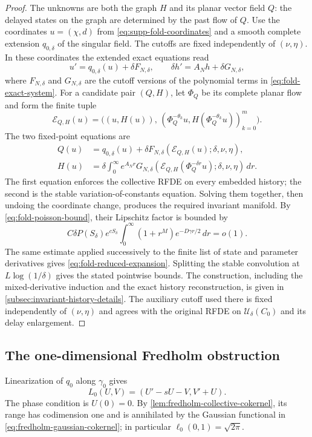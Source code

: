 \begin{proof}
The unknowns are both the graph \(H\) and its planar vector field \(Q\):
the delayed states on the graph are determined by the past flow of \(Q\).
Use the coordinates \(u=(\chi,d)\) from
\cref{eq:supp-fold-coordinates} and a smooth complete extension
\(q_{0,\delta}\) of the singular field.  The cutoffs are fixed independently
of \((\nu,\eta)\).  In these coordinates the extended exact equations read
\[
 u'=q_{0,\delta}(u)+\delta F_{N,\delta},\qquad
 \delta h'=A_Nh+\delta G_{N,\delta},
\]
where \(F_{N,\delta}\) and \(G_{N,\delta}\) are the cutoff versions of the
polynomial terms in \cref{eq:fold-exact-system}.  For a candidate pair
\((Q,H)\), let \(\Phi_Q\) be its complete planar flow and form the finite
tuple
\[
 \mathcal E_{Q,H}(u)=
 \bigl((u,H(u)),\,
       (\Phi_Q^{-\theta_k}u,H(\Phi_Q^{-\theta_k}u))_{k=0}^m\bigr).
\]
The two fixed-point equations are
\begin{align*}
 Q(u)&=q_{0,\delta}(u)+\delta F_{N,\delta}
                (\mathcal E_{Q,H}(u);\delta,\nu,\eta),\\
 H(u)&=\delta\int_0^\infty e^{A_Nr}G_{N,\delta}
       (\mathcal E_{Q,H}(\Phi_Q^{-\delta r}u);\delta,\nu,\eta)\,dr.
\end{align*}
The first equation enforces the collective RFDE on every embedded history;
the second is the stable variation-of-constants equation.  Solving them
together, then undoing the coordinate change, produces the required
invariant manifold.  By \cref{eq:fold-poisson-bound}, their Lipschitz factor is
bounded by
\[
 C\delta P(S_\delta)e^{cS_\delta}
 \int_0^\infty(1+r^M)e^{-D\gamma r/2}\,dr=o(1).
\]
The same estimate applied successively to the finite list of state and
parameter derivatives gives \cref{eq:fold-reduced-expansion}.  Splitting the
stable convolution at \(L\log(1/\delta)\) gives the stated pointwise bounds.
The construction, including the mixed-derivative induction and the exact
history reconstruction, is given in
\cref{subsec:invariant-history-details}.  The auxiliary cutoff used there is
fixed independently of \((\nu,\eta)\) and agrees with the original RFDE on
\(\mathcal U_\delta(C_0)\) and its delay enlargement.
\end{proof}

\subsection{The one-dimensional Fredholm obstruction}

Linearization of \(q_0\) along \(\gamma_0\) gives
\begin{equation}
 L_0(U,V)=(U'-sU-V,V'+U).                            \label{eq:fold-linear-operator}
\end{equation}
The phase condition is \(U(0)=0\).  By
\cref{lem:fredholm-collective-cokernel}, its range has codimension one and is
annihilated by the Gaussian functional in
\cref{eq:fredholm-gaussian-cokernel}; in particular
\(\ell_0(0,1)=\sqrt{2\pi}\).

